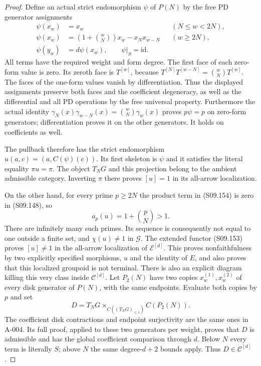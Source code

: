 \begin{proof}
Define an actual strict endomorphism $\psi$ of $P(N)$
by the free PD generator assignments
\[
 \begin{aligned}
 \psi(x_w)&=x_w &&(N\leq w<2N),\\
 \psi(x_w)&=\left(1+\binom wN\right)x_w-x_Nx_{w-N}
                                             &&(w\geq2N),\\
 \psi(y_w)&=d\psi(x_w),\qquad \psi|_S=\mathrm{id}.
 \end{aligned}
 \tag{S09.154}
\]
All terms have the required weight and form degree.
The first face of each zero-form value is zero.
Its zeroth face is $T^{[w]}$, because
$T^{[N]}T^{[w-N]}=\binom wN T^{[w]}$.
The faces of the one-form values vanish by differentiation.
Thus the displayed assignments preserve both faces and
the coefficient degeneracy, as well as the differential
and all PD operations by the free universal property.
Furthermore the actual identity
$\gamma_N(x)\gamma_{w-N}(x)=\binom wN\gamma_w(x)$
proves $p\psi=p$ on zero-form generators; differentiation
proves it on the other generators. It holds on coefficients
as well.

The pullback therefore has the strict endomorphism
$u(a,c)=(a,C(\psi)(c))$. Its first skeleton is $\psi$
and it satisfies the literal equality $\pi u=\pi$.
The object $T_NG$ and this projection belong to the
ambient admissible category. Inverting $\pi$ there
proves $[u]=1$ in its all-arrow localization.

On the other hand, for every prime $p\geq2N$ the
product term in (S09.154) is zero in (S09.148), so
\[
                        a_p(u)=1+\binom pN>1.
\]
There are infinitely many such primes. Its sequence
is consequently not equal to one outside a finite
set, and $\chi(u)\ne1$ in $\mathcal G$.
The extended functor (S09.153) proves $[u]\ne1$
in the all-arrow localization of $\mathcal E^{[d]}$.
This proves nonfaithfulness by two explicitly specified
morphisms, $u$ and the identity of $E$, and also proves
that this localized groupoid is not terminal.
There is also an explicit diagram killing this very class
inside $\mathcal C^{[d]}$. Let $P_2(N)$ have two copies
$x_w^{(1)},x_w^{(2)}$ of every disk generator of $P(N)$,
with the same endpoints. Evaluate both copies by $p$ and set
\[
 D=T_NG\mathop{\times}_{C((T_NG)_{\leq1})}C(P_2(N)).
\]
The coefficient disk contractions and endpoint surjectivity
are the same ones in A-004. Its full proof, applied to
these two generators per weight, proves that $D$ is admissible
and has the global coefficient comparison through $d$.
Below $N$ every term is literally $S$; above $N$ the same
degree-$d+2$ bounds apply. Thus $D\in\mathcal C^{[d]}$.


\end{proof}

